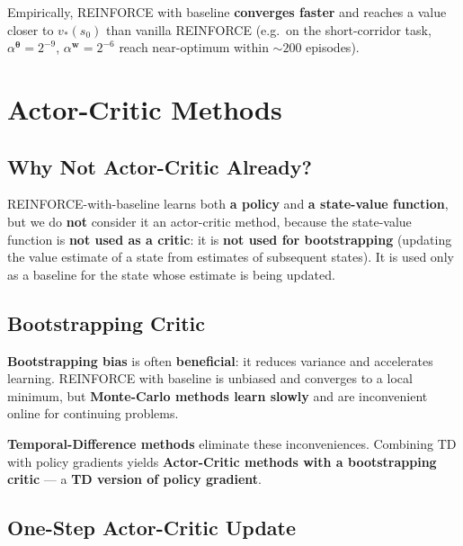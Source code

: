 \documentclass[11pt,a4paper]{article}
\theoremstyle{definition}
\theoremstyle{plain}
\theoremstyle{remark}
\begin{document}
Empirically, REINFORCE with baseline \textbf{converges faster} and reaches a value closer to $v_*(s_0)$ than vanilla REINFORCE (e.g.\ on the short-corridor task, $\alpha^{\boldsymbol{\theta}} = 2^{-9}$, $\alpha^{\mathbf{w}} = 2^{-6}$ reach near-optimum within $\sim 200$ episodes).

\section{Actor-Critic Methods}

\subsection{Why Not Actor-Critic Already?}

REINFORCE-with-baseline learns both \textbf{a policy} and \textbf{a state-value function}, but we do \textbf{not} consider it an actor-critic method, because the state-value function is \textbf{not used as a critic}: it is \textbf{not used for bootstrapping} (updating the value estimate of a state from estimates of subsequent states). It is used only as a baseline for the state whose estimate is being updated.

\subsection{Bootstrapping Critic}

\textbf{Bootstrapping bias} is often \textbf{beneficial}: it reduces variance and accelerates learning. REINFORCE with baseline is unbiased and converges to a local minimum, but \textbf{Monte-Carlo methods learn slowly} and are inconvenient online for continuing problems.

\textbf{Temporal-Difference methods} eliminate these inconveniences. Combining TD with policy gradients yields \textbf{Actor-Critic methods with a bootstrapping critic} — a \textbf{TD version of policy gradient}.

\subsection{One-Step Actor-Critic Update}
\end{document}
